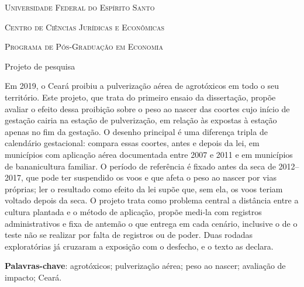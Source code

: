 \documentclass[12pt,oneside,a4paper,english,brazil]{abntex2}
\begin{document}
\frenchspacing

\begin{capa}
  \center
  {\large\textsc{Universidade Federal do Espírito Santo}\par
   \textsc{Centro de Ciências Jurídicas e Econômicas}\par
   \textsc{Programa de Pós-Graduação em Economia}\par}
  \vspace*{3cm}
  {\ABNTEXchapterfont\large\imprimirautor}
  \vfill
  {\ABNTEXchapterfont\bfseries\LARGE\imprimirtitulo}
  \vfill
  {\large Projeto de pesquisa}
  \vfill
  {\large\imprimirlocal\par\imprimirdata}
  \vspace*{1cm}
\end{capa}
\imprimirfolhaderosto

\begin{resumo}
Em 2019, o Ceará proibiu a pulverização aérea de agrotóxicos em todo o seu
território. Este projeto, que trata do primeiro ensaio da dissertação, propõe
avaliar o efeito dessa proibição sobre o peso ao nascer das coortes cujo
início de gestação cairia na estação de pulverização, em relação às expostas
à estação apenas no fim da gestação. O desenho principal é uma diferença
tripla de calendário gestacional: compara essas coortes, antes e depois da
lei, em municípios com aplicação aérea documentada entre 2007 e 2011 e em
municípios de bananicultura familiar. O período de referência é fixado antes
da seca de 2012--2017, que pode ter suspendido os voos e que afeta o peso ao
nascer por vias próprias; ler o resultado como efeito da lei supõe que, sem
ela, os voos teriam voltado depois da seca. O projeto trata como problema
central a distância entre a cultura plantada e o método de aplicação, propõe
medi-la com registros administrativos e fixa de antemão o que entrega em cada
cenário, inclusive o de o teste não se realizar por falta de registros ou de
poder. Duas rodadas exploratórias já cruzaram a exposição com o desfecho, e o
texto as declara.

\textbf{Palavras-chave}: agrotóxicos; pulverização aérea; peso ao nascer;
avaliação de impacto; Ceará.
\end{resumo}

\tableofcontents*
\clearpage

\textual









\postextual
\clearpage



\end{document}

